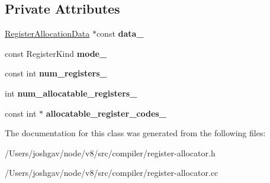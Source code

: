 \subsection*{Private Attributes}
\begin{DoxyCompactItemize}
\item 
\hyperlink{classv8_1_1internal_1_1compiler_1_1_register_allocation_data}{Register\+Allocation\+Data} $\ast$const {\bfseries data\+\_\+}\hypertarget{classv8_1_1internal_1_1compiler_1_1_register_allocator_aec8e8681cdec0091de854665b612089f}{}\label{classv8_1_1internal_1_1compiler_1_1_register_allocator_aec8e8681cdec0091de854665b612089f}

\item 
const Register\+Kind {\bfseries mode\+\_\+}\hypertarget{classv8_1_1internal_1_1compiler_1_1_register_allocator_aa800dd1d57781cfd232e7307debe9c73}{}\label{classv8_1_1internal_1_1compiler_1_1_register_allocator_aa800dd1d57781cfd232e7307debe9c73}

\item 
const int {\bfseries num\+\_\+registers\+\_\+}\hypertarget{classv8_1_1internal_1_1compiler_1_1_register_allocator_a8d658a3c3ba25f4ccb6d620045da63b5}{}\label{classv8_1_1internal_1_1compiler_1_1_register_allocator_a8d658a3c3ba25f4ccb6d620045da63b5}

\item 
int {\bfseries num\+\_\+allocatable\+\_\+registers\+\_\+}\hypertarget{classv8_1_1internal_1_1compiler_1_1_register_allocator_ac23c6782ee34f9c67c12dbf0162ba275}{}\label{classv8_1_1internal_1_1compiler_1_1_register_allocator_ac23c6782ee34f9c67c12dbf0162ba275}

\item 
const int $\ast$ {\bfseries allocatable\+\_\+register\+\_\+codes\+\_\+}\hypertarget{classv8_1_1internal_1_1compiler_1_1_register_allocator_a1078ac92839ac1c0f8812531cb84101c}{}\label{classv8_1_1internal_1_1compiler_1_1_register_allocator_a1078ac92839ac1c0f8812531cb84101c}

\end{DoxyCompactItemize}


The documentation for this class was generated from the following files\+:\begin{DoxyCompactItemize}
\item 
/\+Users/joshgav/node/v8/src/compiler/register-\/allocator.\+h\item 
/\+Users/joshgav/node/v8/src/compiler/register-\/allocator.\+cc\end{DoxyCompactItemize}
